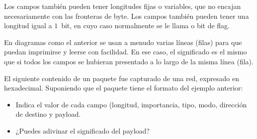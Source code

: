 \begin{remark}
Los campos también pueden tener longitudes fijas o variables, que no encajan necesariamente con las 
fronteras de byte. Los campos también pueden tener una longitud igual a $1$~bit,
en cuyo caso normalmente se le llama  o bit de flag.
\end{remark}


\begin{remark}
En diagramas como el anterior se usan a menudo varias líneas (filas) para que puedan
imprimirse y leerse con facilidad. En ese caso, el significado es el mismo que si todos los campos se hubieran
presentado a lo largo de la misma línea (fila).
\end{remark}

\begin{exercise}
El siguiente contenido de un paquete fue capturado de una red,
expresado en hexadecimal. Suponiendo que el paquete tiene el formato del ejemplo anterior:
% 
\begin{itemize}
\item Indica el valor de cada campo (longitud, importancia, tipo, modo, dirección de destino y payload.
\item ¿Puedes adivinar el significado del payload?
\end{itemize}
% 
\begin{center}
\end{center}
\end{exercise}

